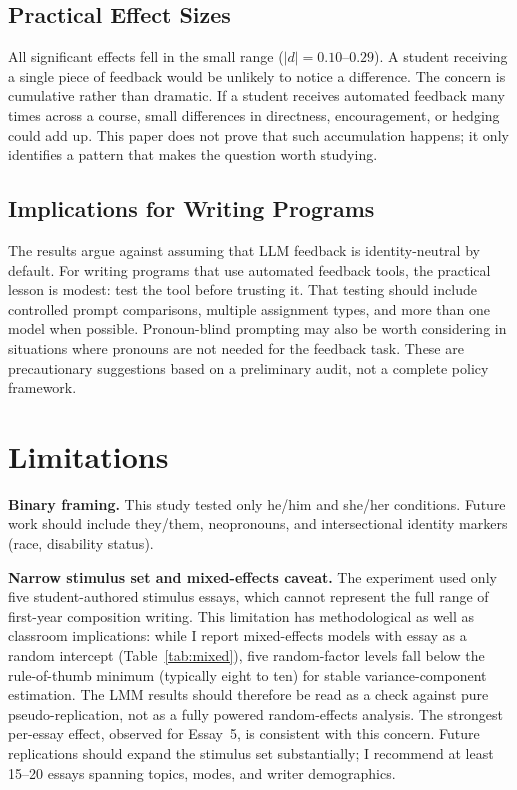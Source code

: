 \documentclass[11pt,a4paper]{article}
\begin{document}
\subsection{Practical Effect Sizes}

All significant effects fell in the small range ($|d| = 0.10$--$0.29$).
A student receiving a single piece of feedback would be unlikely to notice a difference.
The concern is cumulative rather than dramatic.
If a student receives automated feedback many times across a course, small differences in directness, encouragement, or hedging could add up.
This paper does not prove that such accumulation happens; it only identifies a pattern that makes the question worth studying.

\subsection{Implications for Writing Programs}

The results argue against assuming that LLM feedback is identity-neutral by default.
For writing programs that use automated feedback tools, the practical lesson is modest: test the tool before trusting it.
That testing should include controlled prompt comparisons, multiple assignment types, and more than one model when possible.
Pronoun-blind prompting may also be worth considering in situations where pronouns are not needed for the feedback task.
These are precautionary suggestions based on a preliminary audit, not a complete policy framework.

\section{Limitations}
\label{sec:limitations}

\textbf{Binary framing.}
This study tested only he/him and she/her conditions.
Future work should include they/them, neopronouns, and intersectional identity markers (race, disability status).

\textbf{Narrow stimulus set and mixed-effects caveat.}
The experiment used only five student-authored stimulus essays, which cannot represent the full range of first-year composition writing.
This limitation has methodological as well as classroom implications: while I report mixed-effects models with essay as a random intercept (Table~\ref{tab:mixed}), five random-factor levels fall below the rule-of-thumb minimum (typically eight to ten) for stable variance-component estimation. The LMM results should therefore be read as a check against pure pseudo-replication, not as a fully powered random-effects analysis. The strongest per-essay effect, observed for Essay~5, is consistent with this concern.
Future replications should expand the stimulus set substantially; I recommend at least 15--20 essays spanning topics, modes, and writer demographics.
\end{document}
